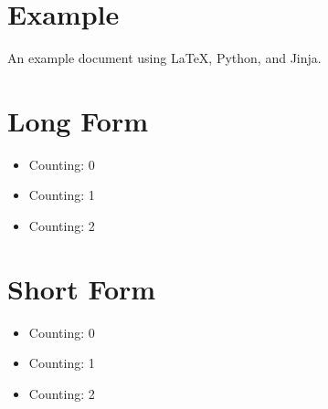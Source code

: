 \documentclass[UTF8]{ctexart}
\begin{document}
\section{Example}
An example document using \LaTeX, Python, and Jinja.
\section{Long Form}
\begin{itemize}
  \item Counting: 0
  \item Counting: 1
  \item Counting: 2
\end{itemize}
\section{Short Form}

\begin{itemize}
  \item Counting: 0
  \item Counting: 1
  \item Counting: 2
\end{itemize}
\end{document}
